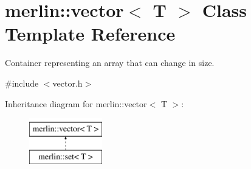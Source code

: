 \hypertarget{classmerlin_1_1vector}{}\section{merlin\+:\+:vector$<$ T $>$ Class Template Reference}
\label{classmerlin_1_1vector}


Container representing an array that can change in size.  




{\ttfamily \#include $<$vector.\+h$>$}

Inheritance diagram for merlin\+:\+:vector$<$ T $>$\+:\begin{figure}[H]
\begin{center}
\leavevmode
\includegraphics[height=2.000000cm]{classmerlin_1_1vector}
\end{center}
\end{figure}

